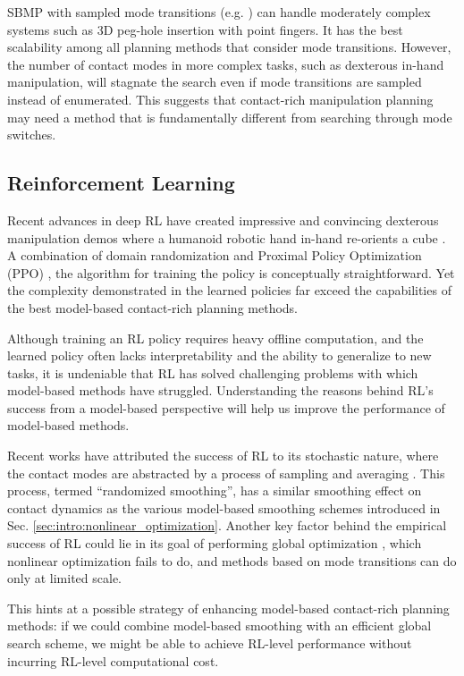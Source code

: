 SBMP with sampled mode transitions (e.g. \cite{cheng2021contact}) can handle moderately complex systems such as 3D peg-hole insertion with point fingers. It has the best scalability among all planning methods that consider mode transitions. However, the number of contact modes in more complex tasks, such as dexterous in-hand manipulation, will stagnate the search even if mode transitions are sampled instead of enumerated. This suggests that contact-rich manipulation planning may need a method that is fundamentally different from searching through mode switches.


\subsection{Reinforcement Learning}
Recent advances in deep RL have created impressive and convincing dexterous manipulation demos where a humanoid robotic hand in-hand re-orients a cube \cite{andrychowicz2020learning, handa2022dextreme}. A combination of domain randomization \cite{tobin2017domain} and Proximal Policy Optimization (PPO) \cite{schulman2017ppo}, the algorithm for training the policy is conceptually straightforward. Yet the complexity demonstrated in the learned policies far exceed the capabilities of the best model-based contact-rich planning methods. 

Although training an RL policy requires heavy offline computation, and the learned policy often lacks interpretability and the ability to generalize to new tasks, it is undeniable that RL has solved challenging problems with which model-based methods have struggled. Understanding the reasons behind RL's success from a model-based perspective will help us improve the performance of model-based methods. 

Recent works have attributed the success of RL to its stochastic nature, where the contact modes are abstracted by a process of sampling and averaging \cite{bundledgradients, pang2022global}. This process, termed ``randomized smoothing'', has a similar smoothing effect on contact dynamics as the various model-based smoothing schemes introduced in Sec. \ref{sec:intro:nonlinear_optimization}. Another key factor behind the empirical success of RL could lie in its goal of performing global optimization \cite{pang2022global}, which nonlinear optimization fails to do, and methods based on mode transitions can do only at limited scale.

This hints at a possible strategy of enhancing model-based contact-rich planning methods: if we could combine model-based smoothing with an efficient global search scheme, we might be able to achieve RL-level performance without incurring RL-level computational cost.


